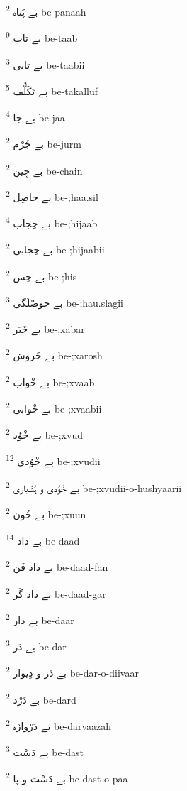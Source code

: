 \documentclass[12pt]{article}
\begin{document}
\begin{RTL}
\begin{multicols}{5}
{\ur بے پَناہ}   \textsuperscript{2} be-panaah

{\ur بے تاب}   \textsuperscript{9} be-taab

{\ur بے تابی}   \textsuperscript{3} be-taabii

{\ur بے تَکَلُّف}   \textsuperscript{5} be-takalluf

{\ur بے جا}   \textsuperscript{4} be-jaa

{\ur بے جُرْم}   \textsuperscript{2} be-jurm

{\ur بے چِین}   \textsuperscript{2} be-chain

{\ur بے حاصِل}   \textsuperscript{2} be-;haa.sil

{\ur بے حِجاب}   \textsuperscript{4} be-;hijaab

{\ur بے حِجابی}   \textsuperscript{2} be-;hijaabii

{\ur بے حِس}   \textsuperscript{2} be-;his

{\ur بے حوصْلَگی}   \textsuperscript{3} be-;hau.slagii

{\ur بے خَبَر}   \textsuperscript{2} be-;xabar

{\ur بے خَروش}   \textsuperscript{2} be-;xarosh

{\ur بے خْواب}   \textsuperscript{2} be-;xvaab

{\ur بے خْوابی}   \textsuperscript{2} be-;xvaabii

{\ur بے خْوُد}   \textsuperscript{2} be-;xvud

{\ur بے خْوُدی}   \textsuperscript{12} be-;xvudii

{\ur بے خْوُدی و ہُشْیاری}   \textsuperscript{2} be-;xvudii-o-hushyaarii

{\ur بے خُون}   \textsuperscript{2} be-;xuun

{\ur بے داد}   \textsuperscript{14} be-daad

{\ur بے داد فَن}   \textsuperscript{2} be-daad-fan

{\ur بے داد گَر}   \textsuperscript{2} be-daad-gar

{\ur بے دار}   \textsuperscript{2} be-daar

{\ur بے دَر}   \textsuperscript{3} be-dar

{\ur بے دَر و دِیوار}   \textsuperscript{2} be-dar-o-diivaar

{\ur بے دَرْد}   \textsuperscript{2} be-dard

{\ur بے دَرْوازَہ}   \textsuperscript{2} be-darvaazah

{\ur بے دَسْت}   \textsuperscript{3} be-dast

{\ur بے دَسْت و پا}   \textsuperscript{2} be-dast-o-paa


\end{multicols}
\end{RTL}
\end{document}
